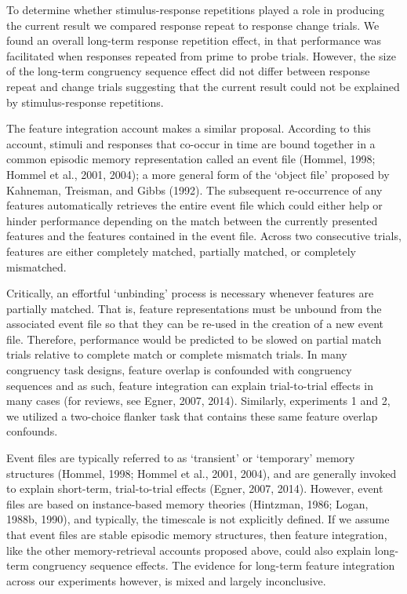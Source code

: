 \documentclass[]{DissertateCUNY}
\begin{document}
To determine whether stimulus-response repetitions played a role in
producing the current result we compared response repeat to response
change trials. We found an overall long-term response repetition effect,
in that performance was facilitated when responses repeated from prime
to probe trials. However, the size of the long-term congruency sequence
effect did not differ between response repeat and change trials
suggesting that the current result could not be explained by
stimulus-response repetitions.

The feature integration account makes a similar proposal. According to
this account, stimuli and responses that co-occur in time are bound
together in a common episodic memory representation called an event file
(Hommel, 1998; Hommel et al., 2001, 2004); a more general form of the
`object file' proposed by Kahneman, Treisman, and Gibbs (1992). The
subsequent re-occurrence of any features automatically retrieves the
entire event file which could either help or hinder performance
depending on the match between the currently presented features and the
features contained in the event file. Across two consecutive trials,
features are either completely matched, partially matched, or completely
mismatched.

Critically, an effortful `unbinding' process is necessary whenever
features are partially matched. That is, feature representations must be
unbound from the associated event file so that they can be re-used in
the creation of a new event file. Therefore, performance would be
predicted to be slowed on partial match trials relative to complete
match or complete mismatch trials. In many congruency task designs,
feature overlap is confounded with congruency sequences and as such,
feature integration can explain trial-to-trial effects in many cases
(for reviews, see Egner, 2007, 2014). Similarly, experiments 1 and 2, we
utilized a two-choice flanker task that contains these same feature
overlap confounds.

Event files are typically referred to as `transient' or `temporary'
memory structures (Hommel, 1998; Hommel et al., 2001, 2004), and are
generally invoked to explain short-term, trial-to-trial effects (Egner,
2007, 2014). However, event files are based on instance-based memory
theories (Hintzman, 1986; Logan, 1988b, 1990), and typically, the
timescale is not explicitly defined. If we assume that event files are
stable episodic memory structures, then feature integration, like the
other memory-retrieval accounts proposed above, could also explain
long-term congruency sequence effects. The evidence for long-term
feature integration across our experiments however, is mixed and largely
inconclusive.
\end{document}
